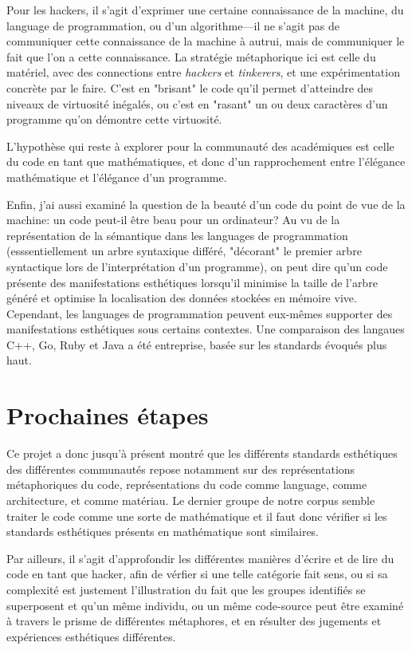 \documentclass{article}
\begin{document}
Pour les hackers, il s'agit d'exprimer une certaine connaissance de la machine, du language de programmation, ou d'un algorithme—il ne s'agit pas de communiquer cette connaissance de la machine à autrui, mais de communiquer le fait que l'on a cette connaissance. La stratégie métaphorique ici est celle du matériel, avec des connections entre \emph{hackers} et \emph{tinkerers}, et une expérimentation concrète par le faire. C'est en "brisant" le code qu'il permet d'atteindre des niveaux de virtuosité inégalés, ou c'est en "rasant" un ou deux caractères d'un programme qu'on démontre cette virtuosité.

L'hypothèse qui reste à explorer pour la communauté des académiques est celle du code en tant que mathématiques, et donc d'un rapprochement entre l'élégance mathématique et l'élégance d'un programme.

Enfin, j'ai aussi examiné la question de la beauté d'un code du point de vue de la machine: un code peut-il être beau pour un ordinateur? Au vu de la représentation de la sémantique dans les languages de programmation (esssentiellement un arbre syntaxique différé, "décorant" le premier arbre syntactique lors de l'interprétation d'un programme), on peut dire qu'un code présente des manifestations esthétiques lorsqu'il minimise la taille de l'arbre généré et optimise la localisation des données stockées en mémoire vive. Cependant, les languages de programmation peuvent eux-mêmes supporter des manifestations esthétiques sous certains contextes. Une comparaison des langaues C++, Go, Ruby et Java a été entreprise, basée sur les standards évoqués plus haut.

\section{Prochaines étapes}

Ce projet a donc jusqu'à présent montré que les différents standards esthétiques des différentes communautés repose notamment sur des représentations métaphoriques du code, représentations du code comme language, comme architecture, et comme matériau. Le dernier groupe de notre corpus semble traiter le code comme une sorte de mathématique et il faut donc vérifier si les standards esthétiques présents en mathématique\cite{rota_phenomenology_1997} sont similaires.

Par ailleurs, il s'agit d'approfondir les différentes manières d'écrire et de lire du code en tant que hacker, afin de vérfier si une telle catégorie fait sens, ou si sa complexité est justement l'illustration du fait que les groupes identifiés se superposent et qu'un même individu, ou un même code-source peut être examiné à travers le prisme de différentes métaphores, et en résulter des jugements et expériences esthétiques différentes.
\end{document}
